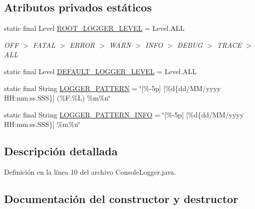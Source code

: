 \subsection*{Atributos privados estáticos}
\begin{DoxyCompactItemize}
\item 
static final Level \mbox{\hyperlink{classcom_1_1ruralhousejsf_1_1logger_1_1_console_logger_ae460ea729626c8bac117b5d2e27913fa}{R\+O\+O\+T\+\_\+\+L\+O\+G\+G\+E\+R\+\_\+\+L\+E\+V\+EL}} = Level.\+A\+LL
\begin{DoxyCompactList}\small\item\em {\ttfamily O\+FF $>$ F\+A\+T\+AL $>$ E\+R\+R\+OR $>$ W\+A\+RN $>$ I\+N\+FO $>$ D\+E\+B\+UG $>$ T\+R\+A\+CE $>$ A\+LL} \end{DoxyCompactList}\item 
static final Level \mbox{\hyperlink{classcom_1_1ruralhousejsf_1_1logger_1_1_console_logger_ae0220e0b1c6452568125f7f1285627be}{D\+E\+F\+A\+U\+L\+T\+\_\+\+L\+O\+G\+G\+E\+R\+\_\+\+L\+E\+V\+EL}} = Level.\+A\+LL
\item 
static final String \mbox{\hyperlink{classcom_1_1ruralhousejsf_1_1logger_1_1_console_logger_a7ea77718b8e1412c1d637c7a5ae4e7c0}{L\+O\+G\+G\+E\+R\+\_\+\+P\+A\+T\+T\+E\+RN}} = \char`\"{}\mbox{[}\%-\/5p\mbox{]} \mbox{[}\%d\{dd/\+M\+M/yyyy H\+H\+:mm\+:ss.\+S\+S\+S\}\mbox{]} (\%\+F\+:\%\+L) \%m\%n\char`\"{}
\item 
static final String \mbox{\hyperlink{classcom_1_1ruralhousejsf_1_1logger_1_1_console_logger_a098472007554045743104c7534609e02}{L\+O\+G\+G\+E\+R\+\_\+\+P\+A\+T\+T\+E\+R\+N\+\_\+\+I\+N\+FO}} = \char`\"{}\mbox{[}\%-\/5p\mbox{]} \mbox{[}\%d\{dd/\+M\+M/yyyy H\+H\+:mm\+:ss.\+S\+S\+S\}\mbox{]} \%m\%n\char`\"{}
\end{DoxyCompactItemize}


\subsection{Descripción detallada}


Definición en la línea 10 del archivo Console\+Logger.\+java.



\subsection{Documentación del constructor y destructor}
\mbox{\label{classcom_1_1ruralhousejsf_1_1logger_1_1_console_logger_a51a46eb118739bc4e500b3f257ca170e}} 
